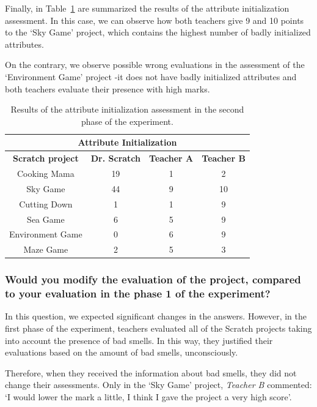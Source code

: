 Finally, in Table~\ref{table:assessment_experiment_attribute_initialization} are summarized the results of the attribute initialization assessment. In this case, we can observe how both teachers give 9 and 10 points to the `Sky Game' project, which contains the highest number of badly initialized attributes.

On the contrary, we observe possible wrong evaluations in the assessment of the `Environment Game' project -it does not have badly initialized attributes and both teachers evaluate their presence with high marks. 

\begin{table}
    \centering
    \begin{tabular}{|c|c|c|c|}
        \hline
        \multicolumn{4}{|c|}{\textbf{Attribute Initialization}} \\ \hline
        \textbf{Scratch project} & \textbf{Dr. Scratch} & \textbf{Teacher A} & \textbf{Teacher B} \\ \hline
        Cooking Mama  & 19 & 1 & 2  \\ \hline
        Sky Game & 44 & 9 & 10 \\ \hline
        Cutting Down  & 1 & 1 & 9  \\ \hline
        Sea Game  & 6 & 5 & 9  \\ \hline
        Environment Game  & 0 & 6 & 9  \\ \hline
        Maze Game  & 2 & 5 & 3  \\ \hline
    \end{tabular}
    \caption{Results of the attribute initialization assessment in the second phase of the experiment.}
    \label{table:assessment_experiment_attribute_initialization}
\end{table}


\subsubsection{Would you modify the evaluation of the project, compared to your evaluation in the phase 1 of the experiment?}
\label{subsubsec:modification_experiment}

In this question, we expected significant changes in the answers. However, in the first phase of the experiment, teachers evaluated all of the Scratch projects taking into account the presence of bad smells. In this way, they justified their evaluations based on the amount of bad smells, unconsciously.

Therefore, when they received the information about bad smells, they did not change their assessments. Only in the `Sky Game' project, \textit{Teacher B} commented: `I would lower the mark a little, I think I gave the project a very high score'. 


